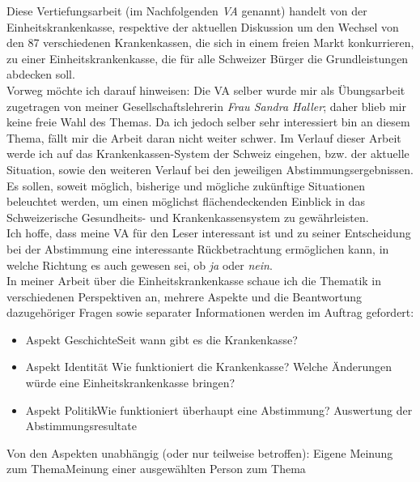 \documentclass[a4paper,12pt]{book}
\begin{document}
Diese Vertiefungsarbeit (im Nachfolgenden \textit{VA} genannt) handelt von der Einheitskrankenkasse, respektive der aktuellen Diskussion um den Wechsel von den 87 verschiedenen Krankenkassen, die sich in einem freien Markt konkurrieren, zu einer Einheitskrankenkasse, die für alle Schweizer Bürger die Grundleistungen abdecken soll. \\
Vorweg möchte ich darauf hinweisen: Die VA selber wurde mir als Übungsarbeit zugetragen von meiner Gesellschaftslehrerin \textit{Frau Sandra Haller}; daher blieb mir keine freie Wahl des Themas. Da ich jedoch selber sehr interessiert bin an diesem Thema, fällt mir die Arbeit daran nicht weiter schwer. Im Verlauf dieser Arbeit werde ich auf das Krankenkassen-System der Schweiz eingehen, bzw. der aktuelle Situation, sowie den weiteren Verlauf bei den jeweiligen Abstimmungsergebnissen.\\
Es sollen, soweit möglich, bisherige und mögliche zukünftige Situationen beleuchtet werden, um einen möglichst flächendeckenden Einblick in das Schweizerische Gesundheits- und  Krankenkassensystem zu gewährleisten.
\\
Ich hoffe, dass meine VA für den Leser interessant ist und zu seiner Entscheidung bei der Abstimmung eine interessante Rückbetrachtung ermöglichen kann, in welche Richtung es auch gewesen sei, ob \textit{ja} oder \textit{nein}.
\\
In meiner Arbeit über die Einheitskrankenkasse schaue ich die Thematik in verschiedenen Perspektiven an, mehrere Aspekte und die Beantwortung dazugehöriger Fragen sowie separater Informationen werden im Auftrag gefordert:
\begin{itemize}
\item Aspekt Geschichte\newline Seit wann gibt es die Krankenkasse?
\item Aspekt Identität\newline
Wie funktioniert die Krankenkasse?\newline
Welche Änderungen würde eine Einheitskrankenkasse bringen?
\item Aspekt Politik\newline Wie funktioniert überhaupt eine Abstimmung?\newline
Auswertung der Abstimmungsresultate\newline
\end{itemize}
Von den Aspekten unabhängig (oder nur teilweise betroffen): \newline Eigene Meinung zum Thema\newline Meinung einer ausgewählten Person zum Thema\newline
\end{document}
